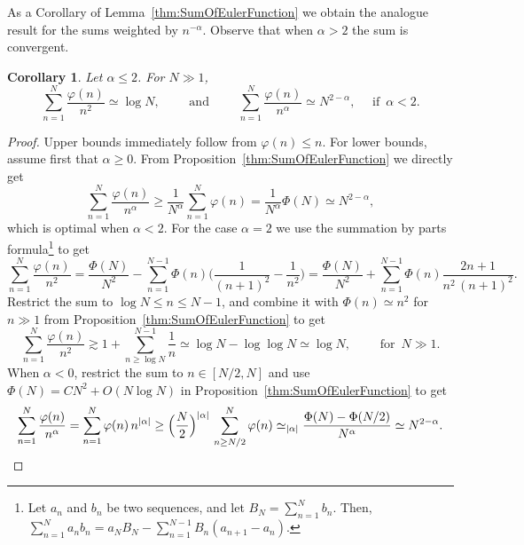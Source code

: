 \documentclass[11pt,reqno]{amsart}
\newtheorem{cor}[thm]{Corollary}
\theoremstyle{definition}
\begin{document}
As a Corollary of Lemma~\ref{thm:SumOfEulerFunction}
we obtain the analogue result for the sums
weighted by $n^{-\alpha}$. 
Observe that when $\alpha > 2$ the sum is convergent. 
\begin{cor}\label{thm:SumOfEulerWithWeight}
Let $\alpha \leq 2$. For $N \gg 1$, 
\begin{equation}
\sum_{n=1}^N \frac{\varphi(n)}{n^2} \simeq \log N, \qquad \text{ and } \qquad \sum_{n=1}^N \frac{\varphi(n)}{n^\alpha} \simeq N^{2 -  \alpha}, \quad \text{ if } \, \alpha < 2.
\end{equation}
\end{cor}
\begin{proof}
Upper bounds immediately follow from $\varphi(n) \leq n$. 
For lower bounds, 
assume first that $\alpha \geq 0$. 
From Proposition~\ref{thm:SumOfEulerFunction} 
we directly get 
\begin{equation}
\sum_{n=1}^N \frac{\varphi(n)}{n^\alpha} 
\geq \frac{1}{N^\alpha} \sum_{n=1}^N \varphi(n)
= \frac{1}{N^\alpha} \Phi(N) \simeq N^{2- \alpha},  
\end{equation}
which is optimal when $\alpha < 2$. 
For the case $\alpha = 2$ we use the summation by parts formula\footnote{Let $a_n$ and $b_n$ be two sequences,
and let $B_N = \sum_{n=1}^N b_n$. 
Then,  
$
\sum_{n=1}^N a_n b_n = a_N B_N - \sum_{n=1}^{N-1} B_n (a_{n+1} - a_n).
$
}
to get 
\begin{equation}\label{eq:Sum_By_Parts_Applied}
\sum_{n=1}^N \frac{\varphi(n)}{n^2} 
 = \frac{\Phi(N)}{N^2} - \sum_{n=1}^{N-1} \Phi(n) \Big(\frac{1}{(n+1)^2 } - \frac{1}{n^2} \Big) 
 = \frac{\Phi(N)}{N^2} + \sum_{n=1}^{N-1} \Phi(n) \frac{ 2n+1}{n^2 \, (n+1)^2 }.
\end{equation}
Restrict the sum to 
$\log N \leq n \leq N-1$, 
and combine it with $\Phi(n) \simeq n^2$ for $n \gg 1$ from Proposition~\ref{thm:SumOfEulerFunction}
to get
\begin{equation}
\sum_{n=1}^N \frac{\varphi(n)}{n^2} 
\gtrsim 1 + \sum_{n \geq \log N}^{N-1}  \frac{ 1}{n}
\simeq \log N - \log \log N \simeq \log N, 
\qquad \text{ for } \, N \gg 1. 
\end{equation}
When $\alpha < 0$, restrict the sum to $n \in [N/2, N]$ and use $\Phi(N) = C N^2 + O(N\log N)$ in Proposition~\ref{thm:SumOfEulerFunction} to get
\[
\sum_{n=1}^N \frac{\varphi(n)}{n^\alpha} 
= \sum_{n=1}^N \varphi(n) \, n^{|\alpha|} 
\geq \Big(\frac{N}{2}\Big)^{|\alpha|} \, \sum_{n \geq N/2}^N \varphi(n)
\simeq_{|\alpha|} \frac{\Phi(N) - \Phi(N/2)}{N^\alpha}
\simeq N^{2 - \alpha}. 
\qedhere
\]
\end{proof}
\end{document}
